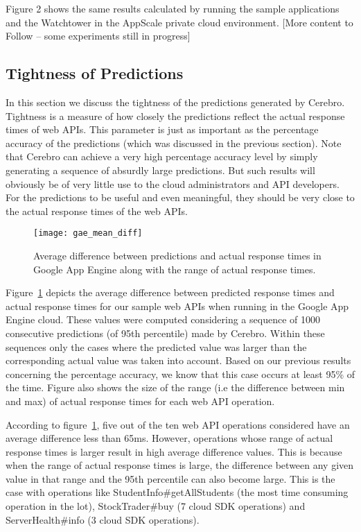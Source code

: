 Figure 2 shows the same results calculated by running the sample applications and the Watchtower in the AppScale private cloud
environment. [More content to Follow -- some experiments still in progress]

\subsection{Tightness of Predictions}
In this section we discuss the tightness of the predictions generated by Cerebro. Tightness is a measure of how closely the predictions
reflect the actual response times of web APIs. This parameter is just as important as the percentage accuracy of the predictions (which 
was discussed in the previous section). Note that Cerebro can achieve a very high percentage accuracy level by simply generating a 
sequence of absurdly large predictions. But such results will obviously be of very little use to the cloud administrators and API
developers. For the predictions to be useful and even meaningful, they should be very close to the actual response times of the web APIs.

\begin{figure}
\centering
\texttt{[image: gae\_mean\_diff]}
\caption{Average difference between predictions and actual response times in Google App Engine along with the range of actual response times.}
\label{fig:gae_mean_diff}
\end{figure}

Figure~\ref{fig:gae_mean_diff} depicts the average difference between predicted response times and actual response times for
our sample web APIs when running in the Google App Engine cloud. These values 
were computed considering a sequence of 1000 consecutive predictions (of 95th percentile) made by Cerebro. Within these sequences only the cases 
where the predicted value was larger than the corresponding actual value was taken into account. Based on our previous results
concerning the percentage accuracy, we know that this case occurs at least 95\% of the time. Figure also shows the size of the
range (i.e the difference between min and max) of actual response times for each web API operation.

According to figure~\ref{fig:gae_mean_diff}, five out of the ten web API operations considered have an average difference less than 65ms.
However, operations whose range of actual response times is larger result in high average difference values. This is because when the 
range of actual response times is large, the difference between any given value in that range and the 95th percentile can also become
large. This is the case with operations like StudentInfo\#getAllStudents (the most time consuming operation in the lot), StockTrader\#buy
(7 cloud SDK operations) and ServerHealth\#info (3 cloud SDK operations).